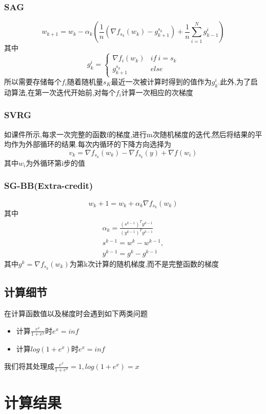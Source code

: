 \documentclass[UTF8]{ctexart}
\begin{document}
  \subsubsection{SAG}
  $$w_{k+1}=w_k-\alpha_k(\frac{1}{n}(\nabla f_{s_k}(w_k)-g_{k+1}^{s_k})+\frac{1}{n}\sum_{i=1}^{N}g_{k-1}^i)$$
  其中
  \begin{equation*}
    g_k^i= \left\{
    \begin{array}{cc}
      \nabla f_{i}(w_k) &if\ i=s_k\\
      g_{k+1}^{s_k} & else
    \end{array}
    \right.
  \end{equation*}
  所以需要存储每个$f_i$随着随机量$s_K$最近一次被计算时得到的值作为$g_k^i$.此外,为了启动算法,在第一次迭代开始前,对每个$f_i$计算一次相应的次梯度
  \subsubsection{SVRG}
  如课件所示,每求一次完整的函数f的梯度,进行m次随机梯度的迭代,然后将结果的平均作为外部循环的结果.每次内循环的下降方向选择为
  $$
  v_k=\nabla f_{s_k}(w_k)-\nabla f_{s_k}(y)+\nabla f(w_i)
$$
其中$w_i$为外循环第i步的值
\subsubsection{SG-BB(Extra-credit)}
  $$
  w_k+1= w_k + \alpha_k \nabla f_{s_k}(w_k)
$$
其中
\begin{equation*}
\begin{split}
\alpha_k = \frac{(s^{k-1})^Ty^{k-1}}{(y^{k-1})^Ty^{k-1}} \\
s^{k-1}=w^k-w^{k-1},\\
 y^{k-1}=g^k-g^{k-1}
\end{split}
\end{equation*}
其中$g^k=\nabla f_{s_k}(w_k)$为第k次计算的随机梯度,而不是完整函数的梯度
\subsection{计算细节}
在计算函数值以及梯度时会遇到如下两类问题
\begin{itemize}
  \item 计算$\frac{e^x}{1+e^x}$时$e^x=inf$
  \item 计算$log(1+e^x)$时$e^x=inf$
\end{itemize}
我们将其处理成$\frac{e^x}{1+e^x}=1,log(1+e^x)=x$
\section{计算结果}
\end{document}
